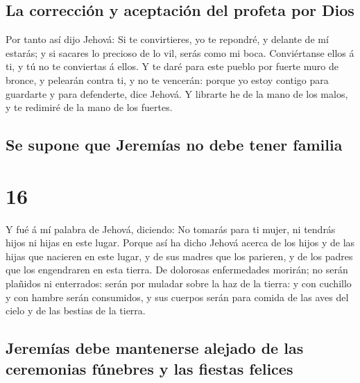 \hypertarget{la-correcciuxf3n-y-aceptaciuxf3n-del-profeta-por-dios}{%
\subsection{La corrección y aceptación del profeta por
Dios}\label{la-correcciuxf3n-y-aceptaciuxf3n-del-profeta-por-dios}}

 Por tanto así dijo Jehová: Si te convirtieres, yo te
repondré, y delante de mí estarás; y si sacares lo precioso de lo vil,
serás como mi boca. Conviértanse ellos á ti, y tú no te conviertas á
ellos.  Y te daré para este pueblo por fuerte muro de
bronce, y pelearán contra ti, y no te vencerán: porque yo estoy contigo
para guardarte y para defenderte, dice Jehová.  Y librarte
he de la mano de los malos, y te redimiré de la mano de los fuertes.

\hypertarget{se-supone-que-jeremuxedas-no-debe-tener-familia}{%
\subsection{Se supone que Jeremías no debe tener
familia}\label{se-supone-que-jeremuxedas-no-debe-tener-familia}}

\hypertarget{section-15}{%
\section{16}\label{section-15}}

 Y fué á mí palabra de Jehová, diciendo:  No
tomarás para ti mujer, ni tendrás hijos ni hijas en este lugar.
 Porque así ha dicho Jehová acerca de los hijos y de las
hijas que nacieren en este lugar, y de sus madres que los parieren, y de
los padres que los engendraren en esta tierra.  De dolorosas
enfermedades morirán; no serán plañidos ni enterrados: serán por muladar
sobre la haz de la tierra: y con cuchillo y con hambre serán consumidos,
y sus cuerpos serán para comida de las aves del cielo y de las bestias
de la tierra.

\hypertarget{jeremuxedas-debe-mantenerse-alejado-de-las-ceremonias-fuxfanebres-y-las-fiestas-felices}{%
\subsection{Jeremías debe mantenerse alejado de las ceremonias fúnebres
y las fiestas
felices}\label{jeremuxedas-debe-mantenerse-alejado-de-las-ceremonias-fuxfanebres-y-las-fiestas-felices}}

